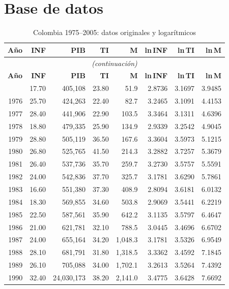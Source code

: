 \documentclass[12pt,a4paper]{article}
\begin{document}
\section{Base de datos}

\begin{longtable}{rrrrrrrr}
\caption{Colombia 1975--2005: datos originales y logarítmicos}\label{tab:datos}\\
\toprule
\textbf{Año}&\textbf{INF}&\textbf{PIB}&\textbf{TI}&\textbf{M}&
\textbf{ln\,INF}&\textbf{ln\,TI}&\textbf{ln\,M}\\
\midrule\endfirsthead
\multicolumn{8}{c}{\footnotesize\itshape(continuación)}\\\toprule
\textbf{Año}&\textbf{INF}&\textbf{PIB}&\textbf{TI}&\textbf{M}&
\textbf{ln\,INF}&\textbf{ln\,TI}&\textbf{ln\,M}\\\midrule\endhead
\bottomrule\endfoot
1975&17.70&405{,}108&23.80&51.9&2.8736&3.1697&3.9485\\
1976&25.70&424{,}263&22.40&82.7&3.2465&3.1091&4.4153\\
1977&28.40&441{,}906&22.90&103.5&3.3464&3.1311&4.6396\\
1978&18.80&479{,}335&25.90&134.9&2.9339&3.2542&4.9045\\
1979&28.80&505{,}119&36.50&167.6&3.3604&3.5973&5.1215\\
1980&26.80&525{,}765&41.50&214.3&3.2882&3.7257&5.3679\\
1981&26.40&537{,}736&35.70&259.7&3.2730&3.5757&5.5591\\
1982&24.00&542{,}836&37.70&325.7&3.1781&3.6290&5.7861\\
1983&16.60&551{,}380&37.30&408.9&2.8094&3.6181&6.0132\\
1984&18.30&569{,}855&34.60&503.8&2.9069&3.5441&6.2219\\
1985&22.50&587{,}561&35.90&642.2&3.1135&3.5797&6.4647\\
1986&21.00&621{,}781&32.10&788.5&3.0445&3.4696&6.6702\\
1987&24.00&655{,}164&34.20&1{,}048.3&3.1781&3.5326&6.9549\\
1988&28.10&681{,}791&31.80&1{,}318.5&3.3362&3.4592&7.1845\\
1989&26.10&705{,}088&34.00&1{,}702.1&3.2613&3.5264&7.4392\\
1990&32.40&24{,}030{,}173&38.20&2{,}141.0&3.4775&3.6428&7.6692\\

\end{longtable}
\end{document}
